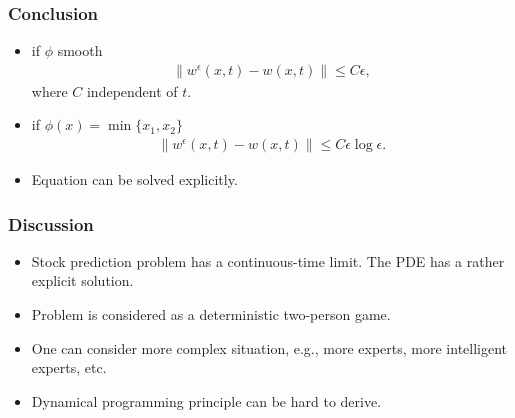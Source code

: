 \documentclass{beamer}
\begin{document}
\begin{frame}
\frametitle{Conclusion}
\begin{itemize}
\item if $\phi$ smooth
\begin{align*}
\|w^\epsilon(x,t)-w(x,t)\|\le C\epsilon,
\end{align*}
where $C$ independent of $t$.
\item if $\phi(x) = \min\{x_1,x_2\}$
\begin{align*}
\|w^\epsilon(x,t)-w(x,t)\|\le C\epsilon\log\epsilon.
\end{align*} 
\item Equation can be solved explicitly.
\end{itemize}
\end{frame}



\begin{frame}
\frametitle{Discussion}
\begin{itemize}
\item Stock prediction problem has a continuous-time limit. The PDE has a rather explicit solution. 
\pause
\item Problem is considered as a deterministic two-person game.
\pause
\item One can consider more complex situation, e.g., more experts, more intelligent experts, etc.
\pause
\item Dynamical programming principle can be hard to derive.
\end{itemize}
\end{frame}
\end{document}
